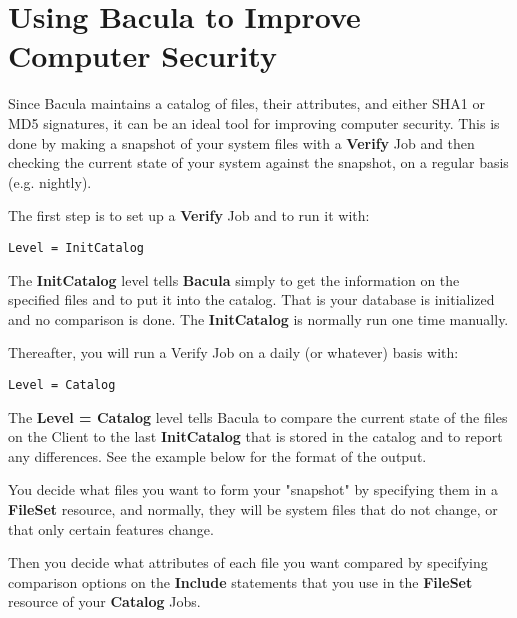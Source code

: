 
\chapter{Using Bacula to Improve Computer Security}
\label{VerifyChapter}

Since Bacula maintains a catalog of files, their attributes, and either SHA1
or MD5 signatures, it can be an ideal tool for improving computer security.
This is done by making a snapshot of your system files with a {\bf Verify} Job
and then checking the current state of your system against the snapshot, on a
regular basis (e.g. nightly). 

The first step is to set up a {\bf Verify} Job and to run it with: 

\footnotesize
\begin{verbatim}
Level = InitCatalog
\end{verbatim}
\normalsize

The {\bf InitCatalog} level tells {\bf Bacula} simply to get the information on
the specified files and to put it into the catalog. That is your database is
initialized and no comparison is done. The {\bf InitCatalog} is normally run
one time manually. 

Thereafter, you will run a Verify Job on a daily (or whatever) basis with: 

\footnotesize
\begin{verbatim}
Level = Catalog
\end{verbatim}
\normalsize

The {\bf Level = Catalog} level tells Bacula to compare the current state of
the files on the Client to the last {\bf InitCatalog} that is stored in the
catalog and to report any differences. See the example below for the format of
the output. 

You decide what files you want to form your "snapshot" by specifying them in
a {\bf FileSet} resource, and normally, they will be system files that do not
change, or that only certain features change. 

Then you decide what attributes of each file you want compared by specifying
comparison options on the {\bf Include} statements that you use in the {\bf
FileSet} resource of your {\bf Catalog} Jobs. 

